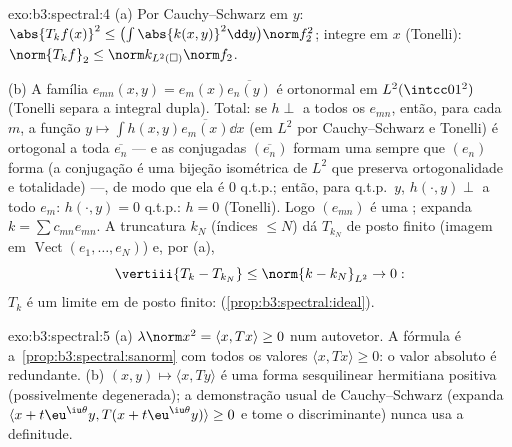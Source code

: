 \begin{solution}{exo:b3:spectral:4}
(a) Por Cauchy--Schwarz em $y$: $\abs{T_kf(x)}^2 \leq
\bigl(\int\abs{k(x,y)}^2\dd y\bigr)\norm f_2^2$; integre em
$x$ (Tonelli): $\norm{T_kf}_2 \leq \norm k_{L^2(\square)}
\norm f_2$.

(b) A família $e_{mn}(x,y) = e_m(x)\overline{e_n(y)}$ é
ortonormal em $L^2(\intcc01^2)$ (Tonelli separa a integral
dupla). Total: se $h \perp$ a todos os $e_{mn}$, então, para cada
$m$, a função $y \mapsto \int h(x,y)\overline{e_m(x)}\dd
x$ (em $L^2$ por Cauchy--Schwarz e Tonelli) é ortogonal a
toda $\overline{e_n}$ --- e as conjugadas
$(\overline{e_n})$ formam uma  sempre que $(e_n)$ forma
(a conjugação é uma bijeção isométrica de $L^2$ que preserva
ortogonalidade e totalidade) ---, de modo que ela é $0$ q.t.p.; então, para q.t.p.\ $y$, $h(\cdot, y) \perp$ a todo
$e_m$: $h(\cdot, y) = 0$ q.t.p.: $h = 0$ (Tonelli). Logo
$(e_{mn})$ é uma ; expanda $k = \sum c_{mn}e_{mn}$.
A truncatura $k_N$ (índices $\leq N$) dá $T_{k_N}$ de
posto finito (imagem em $\operatorname{Vect}(e_1, \dots,
e_N)$) e, por (a),
\[
\vertiii{T_k - T_{k_N}} \leq \norm{k - k_N}_{L^2} \to 0 :
\]
$T_k$ é um limite em  de posto finito: 
(\cref{prop:b3:spectral:ideal}).
\end{solution}

\begin{solution}{exo:b3:spectral:5}
(a) $\lambda\norm x^2 = \langle x, Tx\rangle \geq 0$ num
autovetor. A fórmula é a~\cref{prop:b3:spectral:sanorm} com todos os valores $\langle x,
Tx\rangle \geq 0$: o valor absoluto é redundante.
(b) $(x, y) \mapsto \langle x, Ty\rangle$ é uma forma sesquilinear
hermitiana positiva (possivelmente degenerada); a demonstração usual de
Cauchy--Schwarz (expanda $\langle x + t\eu^{\iu\theta}y,
T(x + t\eu^{\iu\theta}y)\rangle \geq 0$ e tome o
discriminante) nunca usa a definitude.
\end{solution}

